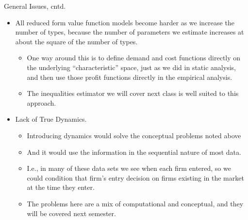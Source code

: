 \begin{frame}{General Issues, cntd.}
\footnotesize
\begin{itemize}
\item All reduced form value function models become harder as we increase
the number of types, because the number of parameters we estimate increases
at about the square of the number of types.
\begin{itemize}
\item One way around this is to define demand and cost functions directly on
the underlying ``characteristic''  space,
just as we did in static analysis, and then use those profit functions
directly in the empirical analysis.
\item The inequalities estimator we will cover next class is well suited to
this approach.
\end{itemize}
\item Lack of True Dynamics.
\begin{itemize}
\item Introducing dynamics would solve the conceptual problems noted above
\item And it would use the information in the sequential nature of most data.
\item I.e., in many of these data sets we see when each firm entered, so we
could condition that firm's entry decision on firms existing in the market
at the time they enter.
\item The problems here are a mix of computational and conceptual, and they
will be covered next semester.
\end{itemize}
\end{itemize}
\end{frame}

















































